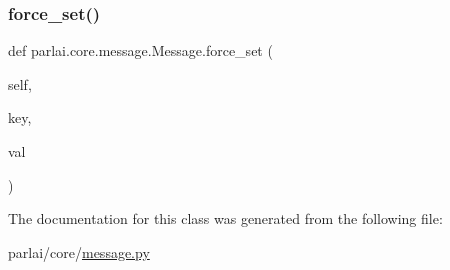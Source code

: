 \mbox{\label{classparlai_1_1core_1_1message_1_1Message_acbafaa2540a6b2ca6513fe9db49a9291}} 
\subsubsection{\texorpdfstring{force\+\_\+set()}{force\_set()}}
{\footnotesize\ttfamily def parlai.\+core.\+message.\+Message.\+force\+\_\+set (\begin{DoxyParamCaption}\item[{}]{self,  }\item[{}]{key,  }\item[{}]{val }\end{DoxyParamCaption})}



The documentation for this class was generated from the following file\+:\begin{DoxyCompactItemize}
\item 
parlai/core/\hyperlink{message_8py}{message.\+py}\end{DoxyCompactItemize}
